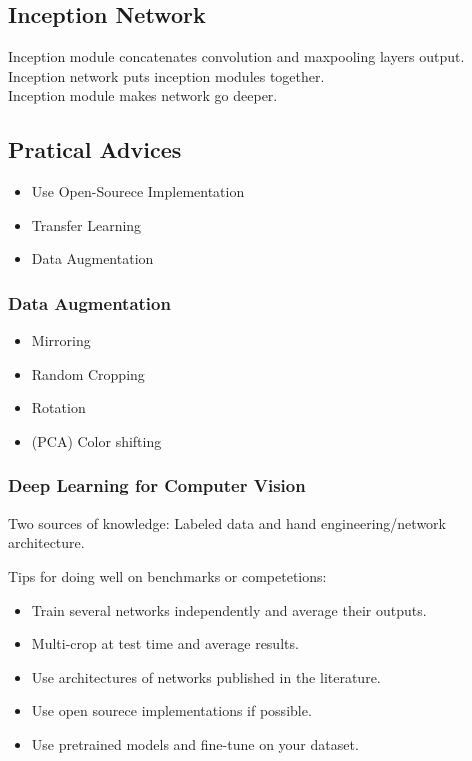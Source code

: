 \documentclass{article}
\begin{document}
	\subsection{Inception Network}
		\begin{flushleft}
			Inception module concatenates convolution and maxpooling layers output. Inception network puts inception modules together.\\
			Inception module makes network go deeper.
		\end{flushleft}
	\subsection{Pratical Advices}
		\begin{itemize}
			\item Use Open-Sourece Implementation
			\item Transfer Learning
			\item Data Augmentation
		\end{itemize}
		\subsubsection{Data Augmentation}
			\begin{itemize}
				\item Mirroring
				\item Random Cropping
				\item Rotation
				\item (PCA) Color shifting
			\end{itemize}
		\subsubsection{Deep Learning for Computer Vision}
			\begin{flushleft}
				Two sources of knowledge: Labeled data and hand engineering/network architecture.
			\end{flushleft}
			\begin{flushleft}
				Tips for doing well on benchmarks or competetions:
				\begin{itemize}
					\item Train several networks independently and average their outputs.
					\item Multi-crop at test time and average results.
					\item Use architectures of networks published in the literature.
					\item Use open sourece implementations if possible.
					\item Use pretrained models and fine-tune on your dataset.
				\end{itemize}
			\end{flushleft}
\end{document}
